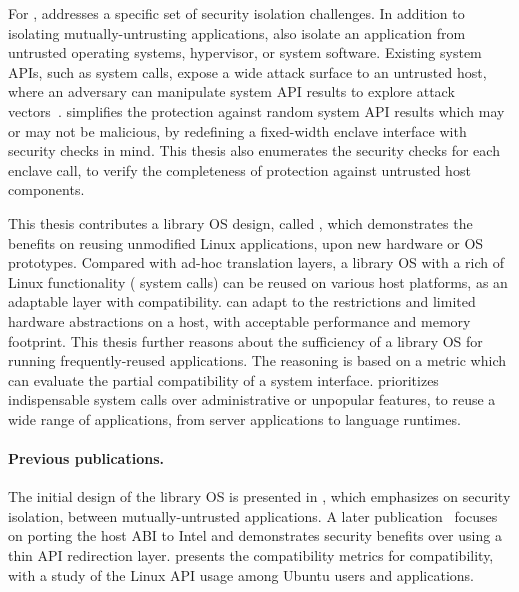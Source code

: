 For \sgx{}, \graphene{} addresses a specific set of security isolation challenges.
In addition to isolating mutually-untrusting applications,
\graphene{} also isolate an \sgx{} application
from untrusted operating systems, hypervisor, or system software.
Existing system APIs, such as system calls, expose a wide attack surface
to an untrusted host, where an adversary
can manipulate system API results to explore attack vectors~\cite{checkoway13iago}.
\graphene{} simplifies
the protection against random system API results which may or may not be malicious,
by redefining a fixed-width enclave interface
with security checks in mind.
This thesis also enumerates the security checks for each enclave call,
to verify the completeness
of protection against untrusted host components.










This thesis contributes a library OS design, called \graphene{},
which demonstrates the benefits on reusing unmodified Linux applications, upon new hardware or OS prototypes.
Compared with ad-hoc translation layers,
a library OS with a rich of Linux functionality (\graphenesyscallnum{} system calls) can be reused on various host platforms, as an adaptable layer with compatibility.
\graphene{} can adapt to the restrictions and
limited hardware abstractions on a host, with acceptable performance and memory footprint.
This thesis further reasons about the sufficiency of a library OS
for running frequently-reused applications. The reasoning is based on a metric which can evaluate the partial compatibility of a system interface.
\graphene{} prioritizes indispensable system calls over administrative or unpopular features,
to reuse a wide range of applications, from server applications to language runtimes.


\paragraph{Previous publications.}
The initial design of the \graphene{} library OS is presented in \cite{tsai14graphene}, which emphasizes on security isolation, between mutually-untrusted applications.
A later publication~\cite{tsai17graphene-sgx} focuses on porting the host ABI
to Intel \sgx{} and demonstrates security benefits 
over using a thin API redirection layer. %
\cite{tsai16apistudy} presents the compatibility metrics for compatibility,
with a study of the Linux API usage among Ubuntu users and applications.

